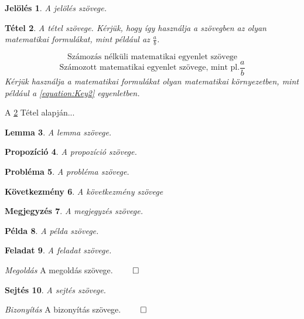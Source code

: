 \documentclass[a4paper,12pt]{article}
\newtheorem{theorem}{Tétel}[section]
\newtheorem{notation}[theorem]{Jelölés}
\newtheorem{lemma}[theorem]{Lemma}
\newtheorem{proposition}[theorem]{Propozíció}%
\newtheorem{problem}[theorem]{Probléma}%
\newtheorem{corollary}[theorem]{Következmény}%
\newtheorem{remark}[theorem]{Megjegyzés}%
\newtheorem{example}[theorem]{Példa}%
\newtheorem{exercise}[theorem]{Feladat}%
\newtheorem{conjecture}[theorem]{Sejtés}%
\renewenvironment{proof}[1][]{\noindent\textit{Bizonyítás} }{$\qed$}
\newenvironment{solution}[1][]{\noindent\textit{Megoldás} }{$\qed$}
\begin{document}
\begin{notation}
A jelölés szövege.
\end{notation}

\begin{theorem}\label{theorem:Key1}
A tétel szövege. Kérjük, hogy így használja a szövegben az olyan matematikai formulákat, mint például az $\frac{a}{b}$. 
\par 
\[
\text{Számozás nélküli matematikai egyenlet szövege}
\]
\begin{equation}\label{equation:Key2}
\text{Számozott matematikai egyenlet szövege, mint pl.} \dfrac{a}{b}
\end{equation}
Kérjük használja a matematikai formulákat olyan matematikai környezetben, mint például a \ref{equation:Key2} egyenletben. 
\end{theorem}

\par A \ref{theorem:Key1} Tétel alapján...

\begin{lemma}
A lemma szövege.
\end{lemma}

\begin{proposition}
A propozíció szövege. 
\end{proposition}

\begin{problem}
A probléma szövege. 
\end{problem}

\begin{corollary}
A következmény szövege
\end{corollary}

\begin{remark}
A megjegyzés szövege. 
\end{remark}

\begin{example}
A példa szövege. 
\end{example}

\begin{exercise}
A feladat szövege. 
\end{exercise}

\begin{solution}
A megoldás szövege. 
\end{solution}

\begin{conjecture}
A sejtés szövege. 
\end{conjecture}

\begin{proof}
A bizonyítás szövege. 
\end{proof}
\end{document}
